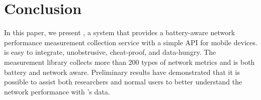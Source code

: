 \section{Conclusion}
\label{ss:conclusion}
In this paper, we present \name{}, a system that
provides a battery-aware network performance
measurement collection service with a simple API for
mobile devices. \name{} is easy to integrate, unobstrusive,
cheat-proof, and data-hungry. The measurement library
collects more than 200 types of network metrics and is
both battery and network aware. Preliminary results
have demonstrated that it is possible to assist both
researchers and normal users to better understand the
network performance with \name{}'s data.
